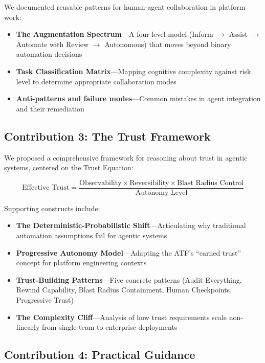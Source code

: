 We documented reusable patterns for human-agent collaboration in platform work:
\begin{itemize}
    \item \textbf{The Augmentation Spectrum}---A four-level model (Inform $\rightarrow$ Assist $\rightarrow$ Automate with Review $\rightarrow$ Autonomous) that moves beyond binary automation decisions
    \item \textbf{Task Classification Matrix}---Mapping cognitive complexity against risk level to determine appropriate collaboration modes
    \item \textbf{Anti-patterns and failure modes}---Common mistakes in agent integration and their remediation
\end{itemize}

\subsection{Contribution 3: The Trust Framework}
\label{subsec:trust-framework-contribution}

We proposed a comprehensive framework for reasoning about trust in agentic systems, centered on the Trust Equation:

\begin{equation}
\text{Effective Trust} = \frac{\text{Observability} \times \text{Reversibility} \times \text{Blast Radius Control}}{\text{Autonomy Level}}
\end{equation}

Supporting constructs include:
\begin{itemize}
    \item \textbf{The Deterministic-Probabilistic Shift}---Articulating why traditional automation assumptions fail for agentic systems
    \item \textbf{Progressive Autonomy Model}---Adapting the ATF's ``earned trust'' concept for platform engineering contexts
    \item \textbf{Trust-Building Patterns}---Five concrete patterns (Audit Everything, Rewind Capability, Blast Radius Containment, Human Checkpoints, Progressive Trust)
    \item \textbf{The Complexity Cliff}---Analysis of how trust requirements scale non-linearly from single-team to enterprise deployments
\end{itemize}

\subsection{Contribution 4: Practical Guidance}
\label{subsec:practical-guidance}

